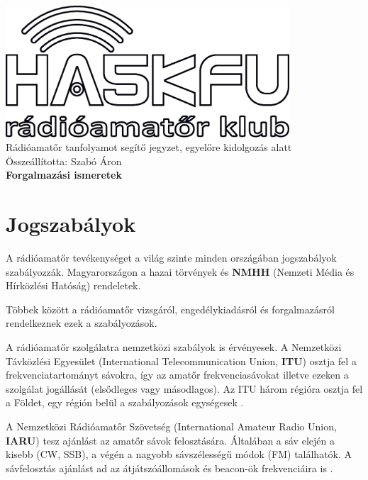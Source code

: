 \documentclass[12pt,a4paper]{article}
\begin{document}
\begin{center}
\includegraphics[width=300pt,keepaspectratio]{figures/ha5kfu.eps}
\\[0.5cm]
Rádióamatőr tanfolyamot segítő jegyzet, egyelőre kidolgozás alatt \\
Összeállította: Szabó Áron %
\\[1cm]

{\huge \bfseries Forgalmazási ismeretek \\[2cm]}



\end{center}

\renewcommand{\contentsname}{Tartalom}\tableofcontents 
\newpage
\section{Jogszabályok}

A rádióamatőr tevékenységet a világ szinte minden országában jogszabályok szabályozzák. Magyarországon a hazai törvények és  \textbf{NMHH} (Nemzeti Média és Hírközlési Hatóság) rendeletek.

Többek között a rádióamatőr vizsgáról, engedélykiadásról és forgalmazásról rendelkeznek ezek a szabályozások.  

A rádióamatőr szolgálatra nemzetközi szabályok is érvényesek. A Nemzetközi Távközlési Egyesület (International Telecommunication Union,  \textbf{ITU}) osztja fel a frekvenciatartományt sávokra, így az amatőr frekvenciasávokat illetve ezeken a szolgálat jogállását (elsődleges vagy másodlagos). Az ITU három régióra osztja fel a Földet, egy régión belül a szabályozások egységesek \cite{iaru_regi}.

A Nemzetközi Rádióamatőr Szövetség (International Amateur Radio Union, \textbf{IARU}) tesz ajánlást az amatőr sávok felosztására. Általában a sáv elején a kisebb (CW, SSB), a végén a nagyobb sávszélességű módok (FM) találhatók. A sávfelosztás ajánlást ad az átjátszóállomások és beacon-ök frekvenciáira is \cite{iaru}. 
\end{document}

